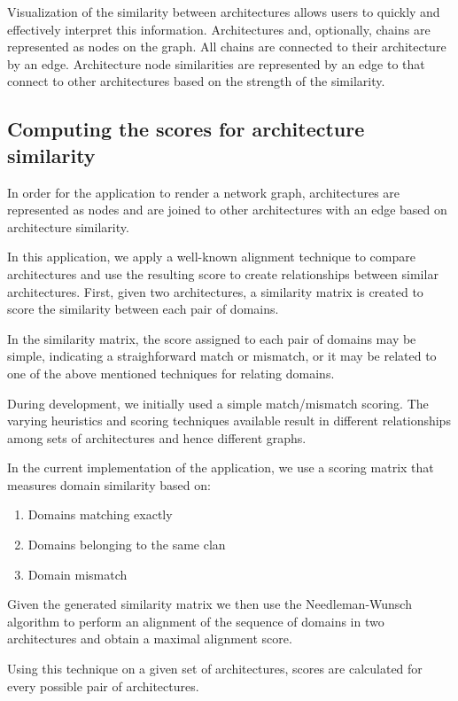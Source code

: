 Visualization of the similarity between architectures allows users to quickly and effectively interpret this information. Architectures and, optionally, chains are represented as nodes on the graph. All chains are connected to their architecture by an edge. Architecture node similarities are represented by an edge to that connect to other architectures based on the strength of the similarity. 


\subsection{Computing the scores for architecture similarity}

In order for the application to render a network graph, architectures are represented as nodes and are joined to other architectures with an edge based on architecture similarity.

In this application, we apply a well-known alignment technique to compare architectures and use the resulting score to create relationships between similar architectures. First, given two architectures, a similarity matrix is created to score the similarity between each pair of domains. 

In the similarity matrix, the score assigned to each pair of domains may be simple, indicating a straighforward match or mismatch, or it may be related to one of the above mentioned techniques for relating domains.

During development, we initially used a simple match/mismatch scoring. The varying heuristics and scoring techniques available result in different relationships among sets of architectures and hence different graphs.

In the current implementation of the application, we use a scoring matrix that measures domain similarity based on:
\begin{enumerate}
	\item Domains matching exactly
	\item Domains belonging to the same clan
	\item Domain mismatch
\end{enumerate}

Given the generated similarity matrix we then use the Needleman-Wunsch algorithm \cite{nwalgo} to perform an alignment of the sequence of domains in two architectures and obtain a maximal alignment score.

Using this technique on a given set of architectures, scores are calculated for every possible pair of architectures.

